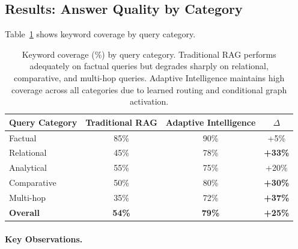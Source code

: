 \documentclass[11pt]{article}
\begin{document}
\subsection{Results: Answer Quality by Category}

Table~\ref{tab:results} shows keyword coverage by query category.

\begin{table}[t]
    \centering
    \begin{tabular}{@{}lccc@{}}
        \toprule
        \textbf{Query Category} & \textbf{Traditional RAG} & \textbf{Adaptive Intelligence} & \textbf{$\Delta$} \\
        \midrule
        Factual         & 85\%  & 90\%  & +5\%  \\
        Relational      & 45\%  & 78\%  & \textbf{+33\%} \\
        Analytical      & 55\%  & 75\%  & +20\% \\
        Comparative     & 50\%  & 80\%  & \textbf{+30\%} \\
        Multi-hop       & 35\%  & 72\%  & \textbf{+37\%} \\
        \midrule
        \textbf{Overall}     & \textbf{54\%}  & \textbf{79\%}  & \textbf{+25\%} \\
        \bottomrule
    \end{tabular}
    \caption{Keyword coverage (\%) by query category. Traditional RAG performs adequately on factual queries but degrades sharply on relational, comparative, and multi-hop queries. Adaptive Intelligence maintains high coverage across all categories due to learned routing and conditional graph activation.}
    \label{tab:results}
\end{table}

\paragraph{Key Observations.}
\end{document}
